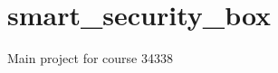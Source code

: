 \chapter{smart\+\_\+security\+\_\+box}
\hypertarget{md__r_e_a_d_m_e}{}\label{md__r_e_a_d_m_e}
\label{md__r_e_a_d_m_e_autotoc_md0}%
%


Main project for course 34338 